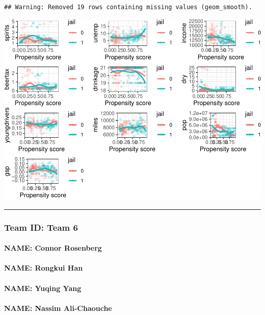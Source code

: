 \documentclass[]{article}
\let\oldparagraph\paragraph
\renewcommand{\paragraph}[1]{\oldparagraph{#1}\mbox{}}
\begin{document}
\begin{verbatim}
## Warning: Removed 19 rows containing missing values (geom_smooth).
\end{verbatim}

\includegraphics{Project3_Rongkui_files/figure-latex/unnamed-chunk-8-1.pdf}

\begin{center}\rule{0.5\linewidth}{0.5pt}\end{center}

\hypertarget{team-id-team-6}{%
\subsubsection{Team ID: Team 6}\label{team-id-team-6}}

\hypertarget{name-connor-rosenberg}{%
\paragraph{NAME: Connor Rosenberg}\label{name-connor-rosenberg}}

\hypertarget{name-rongkui-han}{%
\paragraph{NAME: Rongkui Han}\label{name-rongkui-han}}

\hypertarget{name-yuqing-yang}{%
\paragraph{NAME: Yuqing Yang}\label{name-yuqing-yang}}

\hypertarget{name-nassim-ali-chaouche}{%
\paragraph{NAME: Nassim Ali-Chaouche}\label{name-nassim-ali-chaouche}}
\end{document}
